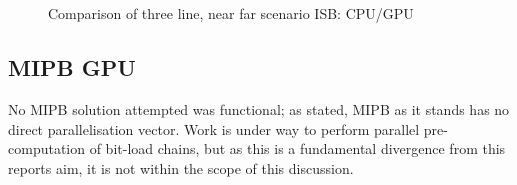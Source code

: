 \begin{figure}[H]
  \centering
  \\
  \\
  \caption{Comparison of three line, near far scenario ISB: CPU/GPU}
  \label{fig:cpugpuISBComparison}
\end{figure}

\subsection{MIPB GPU}
No MIPB solution attempted was functional; as stated, MIPB as it stands has no direct parallelisation vector. Work is under way to perform parallel pre-computation of bit-load chains, but as this is a fundamental divergence from this reports aim, it is not within the scope of this discussion.

